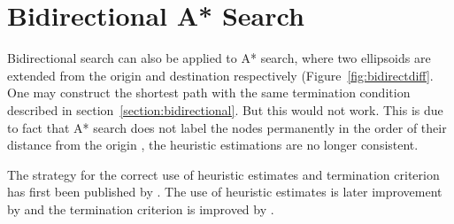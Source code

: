 \begin{comment}
\subsection{Linear Programming Perspective}
\todo[inline]{incomplete}
A* search can be describe in a linear programming perspective.
The reduced cost is $c_{ij} - y_j +y_i$ where $y_j$ and $y_i$ are the dual variables for $(i,j) \in E$, 
essentially A* search puts weight on the edges to and select  out the path with the maximum reduces cost, the weight is the heuristic values.
\begin{alignat}{2}
    \text{Primal: Minimise}   & \quad \sum_{(i, j)\in E} c_{ij} x_{ij} \\
    \text{Subject to} & \quad \sum_j x_{ij} - \sum_j x_{ji} = 0 \quad \forall i\\
    & \quad \sum_j x_{sj} - \sum_j x_{js} = 1 \\
    & \quad \sum_j x_{tj} - \sum_j x_{jt} = -1 \\
    & \quad x_{ij} = \{0,1\} \quad \forall (i,j) \in E
\end{alignat}

\begin{alignat}{2}
    \text{Dual: Maximise} & \quad y_t - y_s \\
    \text{Subject to} & \quad y_j - y_i \leq c_{ij} \quad \forall (i,j) \in E \\
    \text{where} & \quad y_{\cdot} = \sum_j x_{\cdot j} - \sum_j x_{j\cdot}  
\end{alignat}
\end{comment}

\section{Bidirectional A* Search}
Bidirectional search can also be applied to A* search,
where two ellipsoids are extended from the origin and destination respectively (Figure~\ref{fig:bidirectdiff}.
One may construct the shortest path with the same termination condition described in section~\ref{section:bidirectional}.
But this would not work.
This is due to fact that A* search does not label the nodes permanently in the order of their distance from the origin \citep{Klunder},
the heuristic estimations are no longer consistent.

The strategy for the correct use of heuristic estimates and termination criterion has first been published by \citet{Pohl}. The use of heuristic estimates is later improvement by \citet{Ikeda} and the termination criterion is improved by \citet{GoldbergEPP}.

